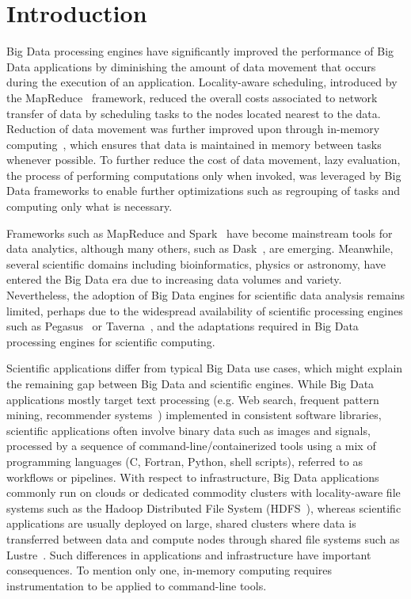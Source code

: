 \section{Introduction} %

Big Data processing engines have significantly improved the performance of Big
Data applications by diminishing the amount of data movement that occurs during
the execution of an application. Locality-aware scheduling, introduced by the
MapReduce~\cite{dean2008mapreduce} framework, reduced the overall costs
associated to network transfer of data by scheduling tasks to the nodes located
nearest to the data. Reduction of data movement was further improved upon
through in-memory computing~\cite{zaharia2016apache}, which ensures that data is
maintained in memory between tasks whenever possible. To further reduce the cost
of data movement, lazy evaluation, the process of performing computations only
when invoked, was leveraged by Big Data frameworks to enable further
optimizations such as regrouping of tasks and computing only what is necessary.

Frameworks such as MapReduce and Spark~\cite{zaharia2016apache} have become
mainstream tools for data analytics, although many others, such as
Dask~\cite{rocklin2015dask}, are emerging. Meanwhile, several scientific domains
including bioinformatics, physics or astronomy, have entered the Big Data era
due to increasing data volumes and variety. Nevertheless, the adoption of Big
Data engines for scientific data analysis remains limited, perhaps due to the
widespread availability of scientific processing engines such as
Pegasus~\cite{deelman2005pegasus} or Taverna~\cite{oinn2004taverna}, and the
adaptations required in Big Data processing engines for scientific computing. 

Scientific applications differ from typical Big Data use cases, which might
explain the remaining gap between Big Data and scientific engines. While Big
Data applications mostly target text processing (e.g. Web search, frequent
pattern mining, recommender systems~\cite{leskovec2014mining}) implemented in
consistent software libraries, scientific applications often involve binary data
such as images and signals, processed by a sequence of
command-line/containerized tools using a mix of programming languages (C,
Fortran, Python, shell scripts), referred to as workflows or pipelines. With
respect to infrastructure, Big Data applications commonly run on clouds or
dedicated commodity clusters with locality-aware file systems such as the Hadoop
Distributed File System (HDFS~\cite{shvachko2010hadoop}), whereas scientific
applications are usually deployed on large, shared clusters where data is
transferred between data and compute nodes through shared file systems such as
Lustre~\cite{schwan2003lustre}. Such differences in applications and
infrastructure have important consequences. To mention only one, in-memory
computing requires instrumentation to be applied to command-line tools. 


